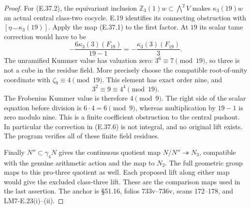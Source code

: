 \begin{proof}
For (E.37.2), the equivariant inclusion
$\mathbb Z_3(1)w\subset\bigwedge^2V$
makes $\kappa_3(19)w$ an actual central
class-two cocycle. E.19 identifies its
connecting obstruction with
$[\eta\smile\kappa_3(19)]$.
Apply the map (E.37.1) to the first
factor. At $19$ its scalar tame
correction would have to be
\[
       -\frac{6\kappa_3(3)(F_{19})}{19-1}
          =-\frac{\kappa_3(3)(F_{19})}{3}.
 \tag{E.37.6}
\]
The unramified Kummer value has valuation
zero: $3^6\equiv7\pmod{19}$, so three
is not a cube in the residue field.
More precisely choose the compatible
root-of-unity coordinate with
$\zeta_9\equiv4\pmod{19}$. This element
has exact order nine, and
\[
         3^2\equiv9\equiv4^4\pmod{19}.
\]
The Frobenius Kummer value is therefore
$4\pmod9$. The right side of the scalar
equation before division is
$6\cdot4=6\pmod9$, whereas multiplication
by $19-1$ is zero modulo nine.
This is a finite coefficient obstruction
to the central pushout. In particular
the correction in (E.37.6) is not
integral, and no original lift exists.
The program verifies all of these finite
field residues.

Finally $N''\subset\gamma_4N$ gives the
continuous quotient map
$N/N''\twoheadrightarrow N_3$,
compatible with the genuine arithmetic
action and the map to $N_2$.
The full geometric group maps to this
pro-three quotient as well. Each proposed
lift along either map would give the
excluded class-three lift. These are
the comparison maps used in the last
assertion. The anchor is \S51.16,
folios 733v--736v, scans 172--178,
and LM7-E.23(i)--(ii).
\end{proof}

